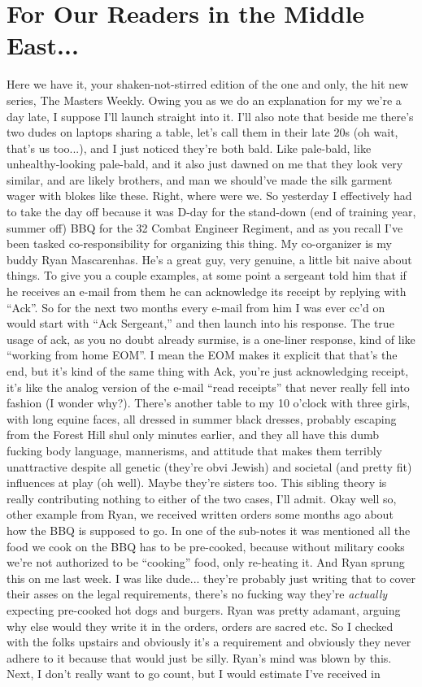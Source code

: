 \documentclass[12pt]{article}
\begin{document}
\newpage

\section*{For Our Readers in the Middle East...}
Here we have it, your shaken-not-stirred edition of the one and only, the hit new series, The Masters Weekly. Owing you as we do an explanation for my we're a day late, I suppose I'll launch straight into it. I'll also note that beside me there's two dudes on laptops sharing a table, let's call them in their late 20s (oh wait, that's us too...), and I just noticed they're both bald. Like pale-bald, like unhealthy-looking pale-bald, and it also just dawned on me that they look very similar, and are likely brothers, and man we should've made the silk garment wager with blokes like these. Right, where were we. So yesterday I effectively had to take the day off because it was D-day for the stand-down (end of training year, summer off) BBQ for the 32 Combat Engineer Regiment, and as you recall I've been tasked co-responsibility for organizing this thing. My co-organizer is my buddy Ryan Mascarenhas. He's a great guy, very genuine, a little bit naive about things. To give you a couple examples, at some point a sergeant told him that if he receives an e-mail from them he can acknowledge its receipt by replying with ``Ack''. So for the next two months every e-mail from him I was ever cc'd on would start with ``Ack Sergeant,'' and then launch into his response. The true usage of ack, as you no doubt already surmise, is a one-liner response, kind of like ``working from home EOM''. I mean the EOM makes it explicit that that's the end, but it's kind of the same thing with Ack, you're just acknowledging receipt, it's like the analog version of the e-mail ``read receipts'' that never really fell into fashion (I wonder why?). There's another table to my 10 o'clock with three girls, with long equine faces, all dressed in summer black dresses, probably escaping from the Forest Hill shul only minutes earlier, and they all have this dumb fucking body language, mannerisms, and attitude that makes them terribly unattractive despite all genetic (they're obvi Jewish) and societal (and pretty fit) influences at play (oh well). Maybe they're sisters too. This sibling theory is really contributing nothing to either of the two cases, I'll admit. Okay well so, other example from Ryan, we received written orders some months ago about how the BBQ is supposed to go. In one of the sub-notes it was mentioned all the food we cook on the BBQ has to be pre-cooked, because without military cooks we're not authorized to be ``cooking'' food, only re-heating it. And Ryan sprung this on me last week. I was like dude... they're probably just writing that to cover their asses on the legal requirements, there's no fucking way they're \textit{actually} expecting pre-cooked hot dogs and burgers. Ryan was pretty adamant, arguing why else would they write it in the orders, orders are sacred etc. So I checked with the folks upstairs and obviously it's a requirement and obviously they never adhere to it because that would just be silly. Ryan's mind was blown by this. Next, I don't really want to go count, but I would estimate I've received in 
\end{document}
